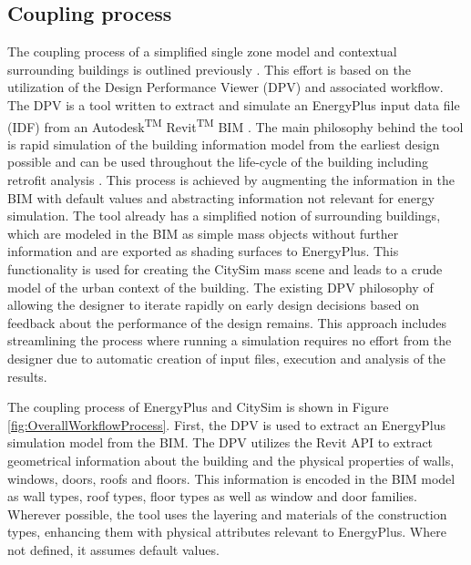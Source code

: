 \documentclass{tBPS2e}
\theoremstyle{plain}
\theoremstyle{definition}
\theoremstyle{remark}
\begin{document}
\subsection{Coupling process}
The coupling process of a simplified single zone model and contextual surrounding buildings is outlined previously \citep{thomas2014multiscale,Thomas:2012wj}. This effort is based on the utilization of the Design Performance Viewer (DPV) and associated workflow. The DPV is a tool written to extract and simulate an EnergyPlus input data file (IDF) from an Autodesk\textsuperscript{TM} Revit\textsuperscript{TM} BIM \citep{Schlueter2009}. The main philosophy behind the tool is rapid simulation of the building information model from the earliest design possible and can be used throughout the life-cycle of the building including retrofit analysis \citep{Miller:2014tu}. This process is achieved by augmenting the information in the BIM with default values and abstracting information not relevant for energy simulation. The tool already has a simplified notion of surrounding buildings, which are modeled in the BIM as simple mass objects without further information and are exported as shading surfaces to EnergyPlus. This functionality is used for creating the CitySim mass scene and leads to a crude model of the urban context of the building. The existing DPV philosophy of allowing the designer to iterate rapidly on early design decisions based on feedback about the performance of the design remains. This approach includes streamlining the process where running a simulation requires no effort from the designer due to automatic creation of input files, execution and analysis of the results.

The coupling process of EnergyPlus and CitySim is shown in Figure \ref{fig:OverallWorkflowProcess}. First, the DPV is used to extract an EnergyPlus simulation model from the BIM. The DPV utilizes the Revit API to extract geometrical information about the building and the physical properties of walls, windows, doors, roofs and floors. This information is encoded in the BIM model as wall types, roof types,
floor types as well as window and door families. Wherever possible, the tool uses the layering and materials of the construction types, enhancing them with physical attributes relevant to EnergyPlus. Where not defined, it assumes default values.
\end{document}
